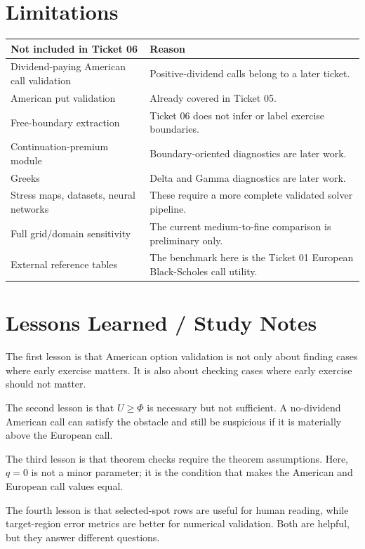 \documentclass[11pt,a4paper]{article}
\begin{document}
\section{Limitations}

\begin{longtable}{L{0.34\textwidth}L{0.54\textwidth}}
\toprule
Not included in Ticket 06 & Reason \\
\midrule
\endhead
Dividend-paying American call validation & Positive-dividend calls belong to a later ticket. \\
American put validation & Already covered in Ticket 05. \\
Free-boundary extraction & Ticket 06 does not infer or label exercise boundaries. \\
Continuation-premium module & Boundary-oriented diagnostics are later work. \\
Greeks & Delta and Gamma diagnostics are later work. \\
Stress maps, datasets, neural networks & These require a more complete validated solver pipeline. \\
Full grid/domain sensitivity & The current medium-to-fine comparison is preliminary only. \\
External reference tables & The benchmark here is the Ticket 01 European Black-Scholes call utility. \\
\bottomrule
\end{longtable}

\section{Lessons Learned / Study Notes}

The first lesson is that American option validation is not only about finding cases where early
exercise matters. It is also about checking cases where early exercise should not matter.

The second lesson is that \(U\geq\Phi\) is necessary but not sufficient. A no-dividend American
call can satisfy the obstacle and still be suspicious if it is materially above the European call.

The third lesson is that theorem checks require the theorem assumptions. Here, \(q=0\) is not a
minor parameter; it is the condition that makes the American and European call values equal.

The fourth lesson is that selected-spot rows are useful for human reading, while target-region
error metrics are better for numerical validation. Both are helpful, but they answer different
questions.
\end{document}
